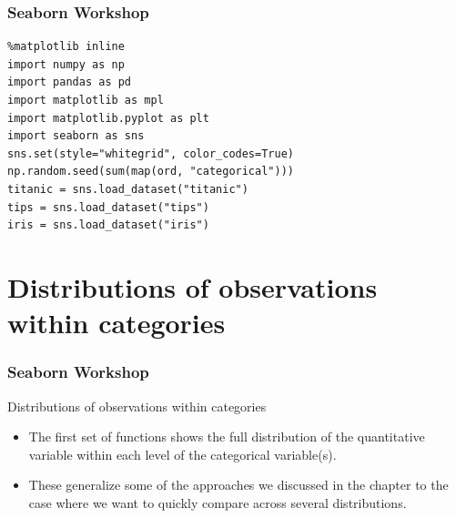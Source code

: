\documentclass{beamer}
\begin{document}
\begin{frame}[fragile]
\frametitle{Seaborn Workshop}
\large
\begin{verbatim}
%matplotlib inline
import numpy as np
import pandas as pd
import matplotlib as mpl
import matplotlib.pyplot as plt
import seaborn as sns
sns.set(style="whitegrid", color_codes=True)
np.random.seed(sum(map(ord, "categorical")))
titanic = sns.load_dataset("titanic")
tips = sns.load_dataset("tips")
iris = sns.load_dataset("iris")
\end{verbatim}

\end{frame}
\section{Distributions of observations within categories}
\begin{frame}[fragile]
\frametitle{Seaborn Workshop}
Distributions of observations within categories
\begin{itemize}
\item The first set of functions shows the full distribution of the quantitative variable within each level of the categorical variable(s). 
\item These generalize some of the approaches we discussed in the chapter to the case where we want to quickly compare across several distributions.
\end{itemize}

\end{frame}
\end{document}
